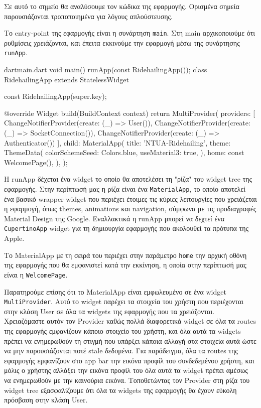 \documentclass[../thesis.tex]{subfiles}
\begin{document}
Σε αυτό το σημείο θα αναλύσουμε τον κώδικα της εφαρμογής.
Ορισμένα σημεία παρουσιάζονται τροποποιημένα για λόγους απλούστευσης.

Το entry-point της εφαρμογής είναι η συνάρτηση \texttt{main}.
Στη main αρχικοποιούμε ότι ρυθμίσεις χρειάζονται, και έπειτα εκκινούμε την εφαρμογή μέσω της συνάρτησης \texttt{runApp}.

\begin{codeblock}{dart}{main.dart}
  void main() {
    runApp(const RidehailingApp());
  }
  class RidehailingApp extends StatelessWidget {
    const RidehailingApp({super.key});

    @override
    Widget build(BuildContext context) {
      return MultiProvider(
        providers: [
          ChangeNotifierProvider(create: (_) => User()),
          ChangeNotifierProvider(create: (_) => SocketConnection()),
          ChangeNotifierProvider(create: (_) => Authenticator())
        ],
        child: MaterialApp(
          title: 'NTUA-Ridehailing',
          theme: ThemeData(
            colorSchemeSeed: Colors.blue,
            useMaterial3: true,
          ),
          home: const WelcomePage(),
        ),
      );
    }
  }
\end{codeblock}

Η runApp δέχεται ένα widget το οποίο θα αποτελέσει τη "ρίζα" του widget tree της εφαρμογής.
Στην περίπτωσή μας η ρίζα είναι ένα \texttt{MaterialApp}, το οποίο αποτελεί ένα βασικό wrapper widget που περιέχει έτοιμες τις κύριες λειτουργίες που χρειάζεται η εφαρμογή, όπως themes, animations και navigation, σύμφωνα με τις προδιαγραφές  Material Design της Google.
Εναλλακτικά η runApp μπορεί να δεχτεί ένα \texttt{CupertinoApp} widget για τη δημιουργία εφαρμογής που ακολουθεί τα πρότυπα της Apple.

Το MaterialApp με τη σειρά του περιέχει στην παράμετρο \texttt{home} την αρχική οθόνη της εφαρμογής που θα εμφανιστεί κατά την εκκίνηση, η οποία στην περίπτωσή μας είναι η \texttt{WelcomePage}.

Παρατηρούμε επίσης ότι το MaterialApp είναι εμφωλευμένο σε ένα widget \texttt{MultiProvider}.
Αυτό το widget παρέχει τα στοιχεία του χρήστη που περιέχονται στην κλάση User σε όλα τα widgets της εφαρμογής που τα χρειάζονται.
Χρειαζόμαστε αυτόν τον Provider καθώς πολλά διαφορετικά widget σε όλα τα routes της εφαρμογής εμφανίζουν κάποιο στοιχείο του χρήστη, και όλα αυτά τα widgets πρέπει να ενημερωθούν τη στιγμή που υπάρξει κάποια αλλαγή στα στοιχεία αυτά ώστε να μην παρουσιάζονται ποτέ stale δεδομένα.
Για παράδειγμα, όλα τα routes της εφαρμογής εμφανίζουν στο app bar την εικόνα προφίλ του συνδεδεμένου χρήστη, και μόλις ο χρήστης αλλάξει την εικόνα προφίλ του όλα αυτά τα widget πρέπει αμέσως να ενημερωθούν με την καινούρια εικόνα.
Τοποθετώντας τον Provider στη ρίζα του widget tree εξασφαλίζουμε ότι όλα τα widgets της εφαρμογής θα έχουν εύκολη πρόσβαση στην κλάση User.
\end{document}
